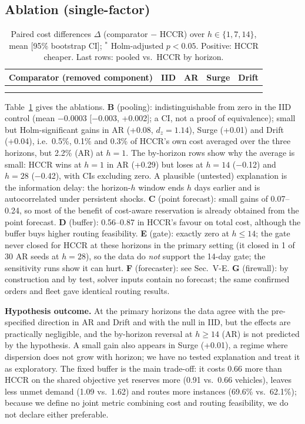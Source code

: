 \documentclass[conference]{IEEEtran}
\begin{document}
\subsection{Ablation (single-factor)}
\begin{table}[t]\centering\caption{Paired cost differences $\Delta$ (comparator $-$ HCCR) over $h\in\{1,7,14\}$, mean [95\% bootstrap CI]; $^\ast$ Holm-adjusted $p<0.05$. Positive: HCCR cheaper. Last rows: pooled vs.\ HCCR by horizon.}\label{tab:abl}
\footnotesize\setlength{\tabcolsep}{3pt}
\begin{tabular}{lcccc}\toprule
Comparator (removed component) & IID & AR & Surge & Drift\\\midrule
\\\midrule
\\\bottomrule
\end{tabular}\end{table}
Table~\ref{tab:abl} gives the ablations. \textbf{B} (pooling): indistinguishable from zero in the IID control (mean $-$0.0003 [$-$0.003, +0.002]; a CI, not a proof of equivalence); small but Holm-significant gains in AR (+0.08, $d_z{=}1.14$), Surge (+0.01) and Drift (+0.04), i.e.\ 0.5\%, 0.1\% and 0.3\% of HCCR's own cost averaged over the three horizons, but 2.2\% (AR) at $h{=}1$. The by-horizon rows show why the average is small: HCCR wins at $h{=}1$ in AR (+0.29) but loses at $h{=}14$ ($-$0.12) and $h{=}28$ ($-$0.42), with CIs excluding zero. A plausible (untested) explanation is the information delay: the horizon-$h$ window ends $h$ days earlier and is autocorrelated under persistent shocks. \textbf{C} (point forecast): small gains of 0.07--0.24, so most of the benefit of cost-aware reservation is already obtained from the point forecast. \textbf{D} (buffer): 0.56--0.87 in HCCR's favour on total cost, although the buffer buys higher routing feasibility. \textbf{E} (gate): exactly zero at $h\le14$; the gate never closed for HCCR at these horizons in the primary setting (it closed in 1 of 30 AR seeds at $h{=}28$), so the data do \emph{not} support the 14-day gate; the sensitivity runs show it can hurt. \textbf{F} (forecaster): see Sec.~V-E. \textbf{G} (firewall): by construction and by test, solver inputs contain no forecast; the same confirmed orders and fleet gave identical routing results.

\textbf{Hypothesis outcome.} At the primary horizons the data agree with the pre-specified direction in AR and Drift and with the null in IID, but the effects are practically negligible, and the by-horizon reversal at $h\ge14$ (AR) is not predicted by the hypothesis. A small gain also appears in Surge (+0.01), a regime where dispersion does not grow with horizon; we have no tested explanation and treat it as exploratory. The fixed buffer is the main trade-off: it costs 0.66 more than HCCR on the shared objective yet reserves more (0.91 vs.\ 0.66 vehicles), leaves less unmet demand (1.09 vs.\ 1.62) and routes more instances (69.6\% vs.\ 62.1\%); because we define no joint metric combining cost and routing feasibility, we do not declare either preferable.
\end{document}
